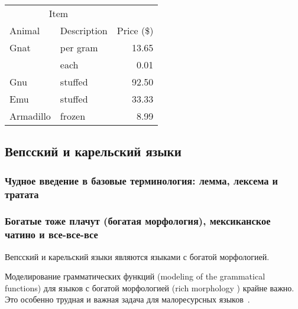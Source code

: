 
\newpage\clearpage


\begin{tabular}{llr}
\hline
\multicolumn{2}{c}{Item} \\
\cline{1-2}
Animal    & Description & Price (\$) \\
\hline
Gnat      & per gram    & 13.65      \\
          & each        & 0.01       \\
Gnu       & stuffed     & 92.50      \\
Emu       & stuffed     & 33.33      \\
Armadillo & frozen      & 8.99       \\
\hline
\end{tabular}






\subsection{Вепсский и карельский языки}\label{sect_review_veps_karelian}


\subsubsection{Чудное введение в базовые терминология: лемма, лексема и тратата}



\subsubsection{Богатые тоже плачут (богатая морфология), мексиканское чатино и все-все-все}

Вепсский и карельский языки являются языками с богатой морфологией.

Моделирование грамматических функций (modeling of the grammatical functions)
для языков с богатой морфологией (rich morphology
) крайне важно.
Это особенно трудная и важная задача
для малоресурсных языков~\cite[2820]{Cruz-Anastasopoulos-Stump2020Chatino}.


